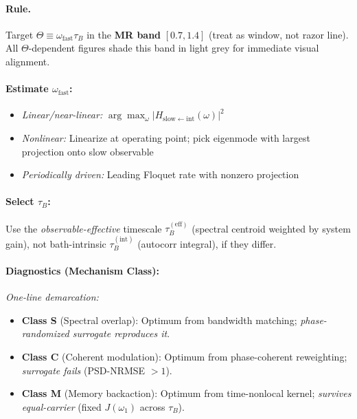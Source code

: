 \documentclass[11pt,letterpaper]{article}
\begin{document}
\begin{tcolorbox}[colback=blue!5!white,colframe=blue!75!black,title=Design Card: Memory-Resonance Condition ($\Theta \approx 1$)]

\paragraph*{Rule.} Target $\Theta \equiv \omega_{\mathrm{fast}} \tau_B$ in the \textbf{MR band} $[0.7, 1.4]$ (treat as window, not razor line). All $\Theta$-dependent figures shade this band in light grey for immediate visual alignment.

\paragraph*{Estimate $\omega_{\mathrm{fast}}$:}
\begin{itemize}[nosep,leftmargin=*]
\item \emph{Linear/near-linear:} $\arg\max_\omega |H_{\mathrm{slow}\leftarrow\mathrm{int}}(\omega)|^2$
\item \emph{Nonlinear:} Linearize at operating point; pick eigenmode with largest projection onto slow observable
\item \emph{Periodically driven:} Leading Floquet rate with nonzero projection
\end{itemize}

\paragraph*{Select $\tau_B$:}
Use the \emph{observable-effective} timescale $\tau_B^{(\mathrm{eff})}$ (spectral centroid weighted by system gain), not bath-intrinsic $\tau_B^{(\mathrm{int})}$ (autocorr integral), if they differ.

\paragraph*{Diagnostics (Mechanism Class):}
\emph{One-line demarcation:}
\begin{itemize}[nosep,leftmargin=*]
\item \textbf{Class S} (Spectral overlap): Optimum from bandwidth matching; \emph{phase-randomized surrogate reproduces it}.
\item \textbf{Class C} (Coherent modulation): Optimum from phase-coherent reweighting; \emph{surrogate fails} (PSD-NRMSE $>1$).
\item \textbf{Class M} (Memory backaction): Optimum from time-nonlocal kernel; \emph{survives equal-carrier} (fixed $J(\omega_1)$ across $\tau_B$).
\end{itemize}


\end{tcolorbox}
\end{document}
